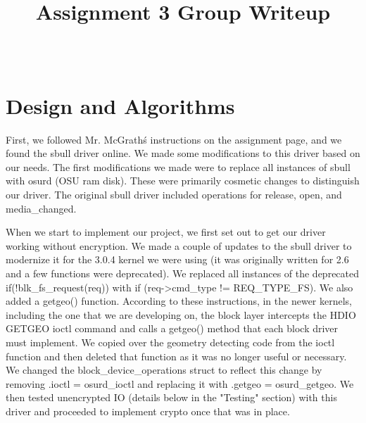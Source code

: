\documentclass[10pt,draftclsnofoot,onecolumn,journal,compsoc]{IEEEtran}
\title{Assignment 3 Group Writeup}
\author{
  \IEEEauthorblockN{Chengxu yan, Xilun Guo, and Xiaomei Wang \\ Group 15} \\
  \IEEEauthorblockA{CS 444: Operating System II \\ Oregon State University}
}
\date{}
\begin{document}
\maketitle
\IEEEdisplaynontitleabstractindextext
\IEEEpeerreviewmaketitle

\newpage

\tableofcontents

\newpage

\section{Design and Algorithms}

First, we followed Mr. McGrath\'s instructions on the assignment page, and we found the sbull driver online. We made some modifications to this driver based on our needs. The first modifications we made were to replace all instances of sbull with osurd (OSU ram disk). These were primarily cosmetic changes to distinguish our driver. The original sbull driver included operations for release, open, and media\_changed. 

When we start to implement our project, we first set out to get our driver working without encryption. We made a couple of updates to the sbull driver to modernize it for the 3.0.4 kernel we were using (it was originally written for 2.6 and a few functions were deprecated). We replaced all instances of the deprecated if(!blk\_fs\_request(req)) with if (req->cmd\_type != REQ\_TYPE\_FS). We also added a getgeo() function. According to these instructions, in the newer kernels, including the one that we are developing on, the block layer intercepts the HDIO GETGEO ioctl command and calls a getgeo() method that each block driver must implement. We copied over the geometry detecting code from the ioctl function and then deleted that function as it was no longer useful or necessary. We changed the block\_device\_operations struct to reflect this change by removing .ioctl = osurd\_ioctl and replacing it with .getgeo = osurd\_getgeo. We then tested unencrypted I\/O (details below in the "Testing" section) with this driver and proceeded to implement crypto once that was in place.
\end{document}
